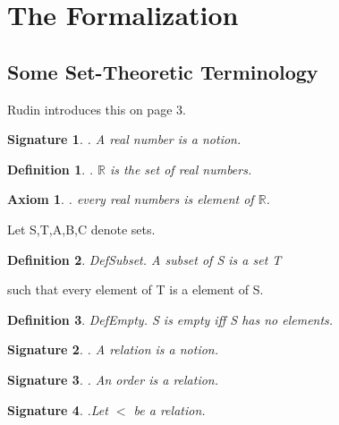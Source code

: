 \documentclass{article}
\newenvironment{forthel}{\begin{leftbar}}{\end{leftbar}}
\newtheorem{axiom}{Axiom}
\newtheorem{definition}{Definition}
\newtheorem{signature}{Signature}
\begin{document}
\section{The Formalization}
\subsection{Some Set-Theoretic Terminology}

Rudin introduces this on page 3.

\begin{forthel}
[set/-s] [element/-s] [belong/-s] [subset/-s] [relation/-s] [number/-s]

\begin{signature}. A real number is a notion.

\end{signature}
\begin{definition}. $\mathbb{R}$ is the set of real numbers. 

\end{definition}
\begin{axiom}. every real numbers is element of $\mathbb{R}$.

\end{axiom}






Let S,T,A,B,C denote sets.

\begin{definition} DefSubset.   A subset of S is a set T

\end{definition}
such that every element of T is a element of S.

\begin{definition} DefEmpty.    S is empty iff S has no elements.

\end{definition}

\begin{signature}. A relation is a notion.

\end{signature}

\begin{signature}. An order is a relation.

\end{signature}

\begin{signature}.Let $<$ be a relation.

\end{signature}


\end{forthel}
\end{document}
